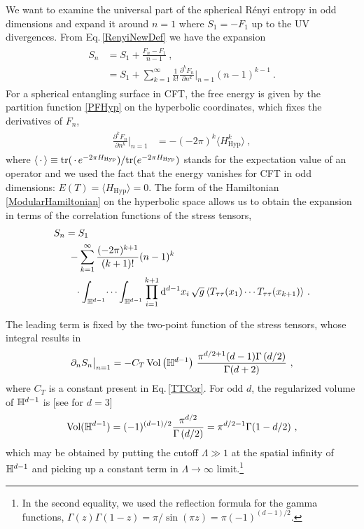 We want to examine the universal part of the spherical R{\'e}nyi entropy in odd dimensions and expand it around $n=1$ where $S_1 = -F_1$ up to the UV divergences. 
From Eq.\,\eqref{RenyiNewDef} we have the expansion
\begin{align}
\begin{aligned}
S_n &= S_1 + \frac{F_n - F_1}{n-1} \ , \\
	&= S_1 + \sum_{k=1}^\infty \frac{1}{k!} \frac{\partial^k F_n}{\partial n^k}\bigg|_{n=1} (n-1)^{k-1} \ .
\end{aligned}
\end{align}
For a spherical entangling surface in CFT, the free energy is given by the partition function \eqref{PFHyp} on the hyperbolic coordinates, which fixes the derivatives of $F_n$, 
\begin{align}
\begin{aligned}
\frac{\partial^k F_n}{\partial n^k}\bigg|_{n=1} &= - (-2\pi)^k \langle H_\text{Hyp}^k\rangle  \ , 
\end{aligned}
\end{align}
where $\langle\, \cdot\, \rangle \equiv {\rm tr} (\,\cdot\, e^{-2\pi H_\text{Hyp}})/{\rm tr} (e^{-2\pi H_\text{Hyp}})$ stands for the expectation value of an operator and we used the fact that the energy vanishes for CFT in odd dimensions: $E(T) = \langle H_\text{Hyp} \rangle= 0$.
The form of the Hamiltonian \eqref{ModularHamiltonian} on the hyperbolic space allows us to obtain the expansion in terms of the correlation functions of the stress tensors,
\begin{align}\label{REexpand}
\begin{aligned}
S_n &= S_1 \\
	&~- \sum_{k=1}^\infty \frac{(-2\pi)^{k+1}}{(k+1)!} (n-1)^k \\
	&\quad \cdot \int_{\mathbb{H}^{d-1}}\!\cdots \int_{\mathbb{H}^{d-1}}\prod_{i=1}^{k+1} \mathrm{d}^{d-1}x_i\,\sqrt{g}\, \langle T_{\tau\tau}(x_1) \cdots T_{\tau\tau}(x_{k+1}) \rangle \ .
\end{aligned}
\end{align}

The leading term is fixed by the two-point function of the stress tensors, whose integral results in \cite{Perlmutter:2013gua}
\begin{align}\label{LeadingRE}
\partial_n S_n\big|_{n=1} = -C_T\,\text{Vol}\left(\mathbb{H}^{d-1}\right)\,\frac{\pi^{d/2+1}(d-1)\Gamma\left(d/2\right)}{\Gamma(d+2)} \ ,
\end{align}
where $C_T$ is a constant present in Eq.\,\eqref{TTCor}.
For odd $d$, the regularized volume of $\mathbb{H}^{d-1}$ is [see \textcite{Klebanov:2011uf} for $d=3$]
\begin{align}\label{HypVolume}
\text{Vol}(\mathbb{H}^{d-1}) = (-1)^{(d-1)/2}\frac{\pi^{d/2}}{\Gamma \left(d/2\right)} = \pi^{d/2-1}\Gamma(1-d/2)\ ,
\end{align}
which may be obtained by putting the cutoff $\Lambda\gg 1$ at the spatial infinity of $\mathbb{H}^{d-1}$ and picking up a constant term in $\Lambda \to \infty$ limit.\footnote{In the second equality, we used the reflection formula for the gamma functions, $\Gamma(z) \Gamma(1-z) = \pi/ \sin (\pi z)= \pi (-1)^{(d-1)/2}$.}


